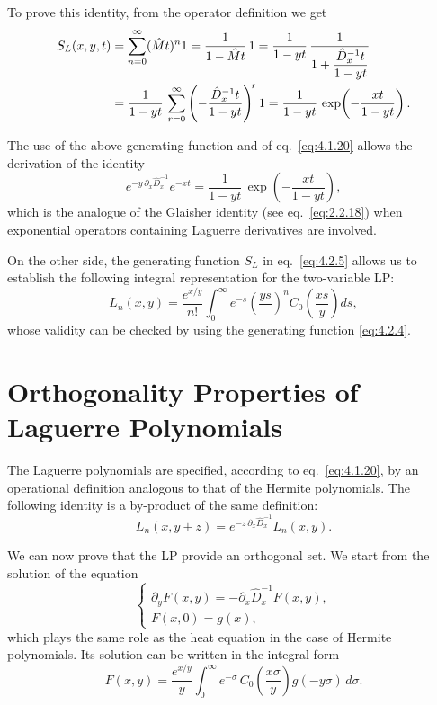 To prove this identity, from the operator definition we get
\begin{align}
S_L(x,y,t)
&= \sum_{n=0}^{\infty} (\hat M t)^n 1
 = \frac{1}{1-\hat M t}\,1
 = \frac{1}{1-yt}\,\frac{1}{1+\dfrac{\hat D_x^{-1}t}{1-yt}} \notag\\
&= \frac{1}{1-yt}\,
\sum_{r=0}^{\infty} \left(-\frac{\hat D_x^{-1}t}{1-yt}\right)^{\!r} 1
 = \frac{1}{1-yt}\,\exp\!\left(-\frac{xt}{1-yt}\right).
\label{eq:4.2.5}
\end{align}

The use of the above generating function and of eq.~\eqref{eq:4.1.20}
allows the derivation of the identity
\begin{equation}
e^{-y\,\partial_x \hat D_x^{-1}} e^{-xt}
= \frac{1}{1-yt}\,\exp\!\left(-\frac{xt}{1-yt}\right),
\label{eq:4.2.6}
\end{equation}
which is the analogue of the Glaisher identity (see eq.~\eqref{eq:2.2.18})
when exponential operators containing Laguerre derivatives are involved.

On the other side, the generating function $S_L$ in eq.~\eqref{eq:4.2.5}
allows us to establish the following integral representation for the two-variable
LP:
\begin{equation}
L_n(x,y) = \frac{e^{x/y}}{n!}\int_0^{\infty} e^{-s}\left(\frac{ys}{}\right)^{\!n}
C_0\!\left(\frac{xs}{y}\right) ds,
\label{eq:4.2.7}
\end{equation}
whose validity can be checked by using the generating function
\eqref{eq:4.2.4}.

\section{Orthogonality Properties of Laguerre Polynomials}

The Laguerre polynomials are specified, according to eq.~\eqref{eq:4.1.20},
by an operational definition analogous to that of the Hermite polynomials.
The following identity is a by-product of the same definition:
\begin{equation}
L_n(x,y+z) = e^{-z\,\partial_x \hat D_x^{-1}} L_n(x,y).
\label{eq:4.3.1}
\end{equation}

We can now prove that the LP provide an orthogonal set. We start from the
solution of the equation
\begin{equation}
\begin{cases}
\partial_y F(x,y) = -\partial_x \hat D_x^{-1} F(x,y),\\[2pt]
F(x,0) = g(x),
\end{cases}
\label{eq:4.3.2}
\end{equation}
which plays the same role as the heat equation in the case of Hermite
polynomials. Its solution can be written in the integral form
\begin{equation}
F(x,y) = \frac{e^{x/y}}{y}\int_0^{\infty} e^{-\sigma}\,
C_0\!\left(\frac{x\sigma}{y}\right) g(-y\sigma)\,d\sigma.
\label{eq:4.3.3}
\end{equation}

